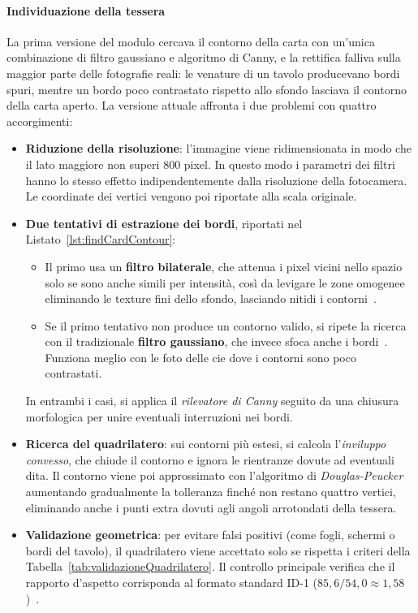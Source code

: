 \paragraph{Individuazione della tessera}
La prima versione del modulo cercava il contorno della carta con un'unica combinazione di filtro gaussiano e algoritmo di Canny, e la rettifica falliva sulla maggior parte delle fotografie reali: le venature di un tavolo producevano bordi spuri, mentre un bordo poco contrastato rispetto allo sfondo lasciava il contorno della carta aperto.
La versione attuale affronta i due problemi con quattro accorgimenti:
\begin{itemize}
     \item \textbf{Riduzione della risoluzione}: l'immagine viene ridimensionata in modo che il lato maggiore non superi $800$ pixel. In questo modo i parametri dei filtri hanno lo stesso effetto indipendentemente dalla risoluzione della fotocamera. Le coordinate dei vertici vengono poi riportate alla scala originale.
    \item \textbf{Due tentativi di estrazione dei bordi}, riportati nel Listato~\ref{lst:findCardContour}: \begin{itemize}
    \item Il primo usa un \textbf{filtro bilaterale}, che attenua i pixel vicini nello spazio solo se sono anche simili per intensità, così da levigare le zone omogenee eliminando le texture fini dello sfondo, lasciando nitidi i contorni~\cite{tomasiBilateralFilteringGray1998}.
    \item Se il primo tentativo non produce un contorno valido, si ripete la ricerca con il tradizionale \textbf{filtro gaussiano}, che invece sfoca anche i bordi~\cite{tomasiBilateralFilteringGray1998}. Funziona meglio con le foto delle \gls{cie} dove i contorni sono poco contrastati.
    \end{itemize} 
    In entrambi i casi, si applica il \textit{rilevatore di Canny} seguito da una chiusura morfologica per unire eventuali interruzioni nei bordi.
    \item \textbf{Ricerca del quadrilatero}: sui contorni più estesi, si calcola l'\textit{inviluppo convesso}, che chiude il contorno e ignora le rientranze dovute ad eventuali dita. Il contorno viene poi approssimato con l'algoritmo di \textit{Douglas-Peucker} aumentando gradualmente la tolleranza finché non restano quattro vertici, eliminando anche i punti extra dovuti agli angoli arrotondati della tessera.
    \item \textbf{Validazione geometrica}: per evitare falsi positivi (come fogli, schermi o bordi del tavolo), il quadrilatero viene accettato solo se rispetta i criteri della Tabella~\ref{tab:validazioneQuadrilatero}.  Il controllo principale verifica che il rapporto d'aspetto corrisponda al formato standard ID-1 ($85{,}6/54{,}0 \approx 1{,}58$)~\cite{icao9303}.
\end{itemize}
